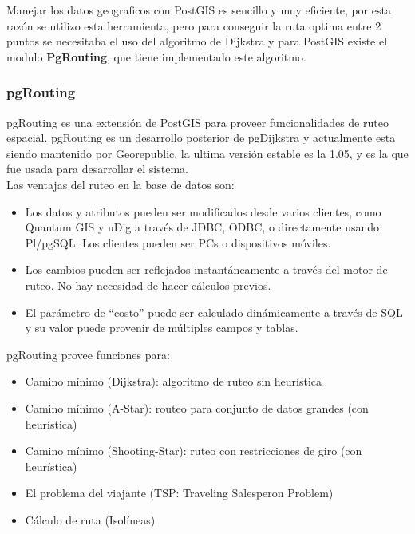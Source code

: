       Manejar los datos geograficos con PostGIS es sencillo y muy eficiente, por esta raz\'on se utilizo esta herramienta, pero para conseguir la ruta optima entre 2 puntos se necesitaba el uso del algoritmo de Dijkstra y para PostGIS existe el modulo \textbf{PgRouting}, que tiene implementado este algoritmo.
      
      \subsubsection{pgRouting} %
      \label{sec:pgrouting}
        pgRouting es una extensi\'on  de  PostGIS para proveer funcionalidades de ruteo espacial. pgRouting es un desarrollo posterior de pgDijkstra y actualmente esta siendo mantenido por Georepublic, la ultima versi\'on estable es la 1.05, y es la que fue usada para desarrollar el sistema.\\

        Las ventajas del ruteo en la base de datos son:
        \begin{itemize}
          \item Los datos y atributos pueden ser modificados desde varios clientes, como Quantum GIS y uDig a través de JDBC, ODBC, o directamente usando Pl/pgSQL. Los clientes pueden ser PCs o dispositivos móviles.
          \item Los cambios pueden ser reflejados instantáneamente a través del motor de ruteo. No hay necesidad de hacer cálculos previos.
          \item El parámetro de ``costo'' puede ser calculado dinámicamente a través de SQL y su valor puede provenir de múltiples campos y tablas.
        \end{itemize}

        pgRouting provee funciones para:
        \begin{itemize}
          \item Camino mínimo (Dijkstra): algoritmo de ruteo sin heurística
          \item Camino mínimo (A-Star): routeo para conjunto de datos grandes (con heurística)
          \item Camino mínimo (Shooting-Star): ruteo con restricciones de giro (con heurística)
          \item El problema del viajante (TSP: Traveling Salesperon Problem)
          \item Cálculo de ruta (Isolíneas)
        \end{itemize}
        
